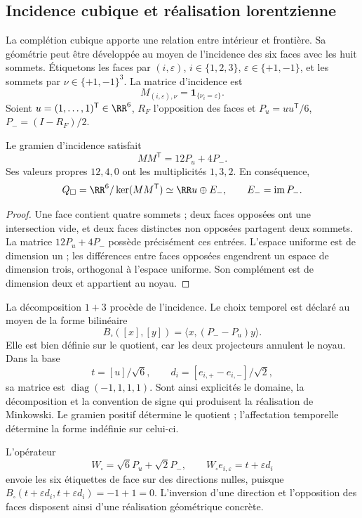 \subsection{Incidence cubique et réalisation lorentzienne}

La complétion cubique apporte une relation entre intérieur et frontière.
Sa géométrie peut être développée au moyen de l'incidence des six faces
avec les huit sommets. Étiquetons les faces par \((i,\varepsilon)\),
\(i\in\{1,2,3\}\), \(\varepsilon\in\{+1,-1\}\), et les sommets par
\(\nu\in\{+1,-1\}^3\). La matrice d'incidence est
\[
 M_{(i,\varepsilon),\nu}=\mathbf1_{\{\nu_i=\varepsilon\}}.
\]
Soient \(u=(1,\ldots,1)^{\mathsf T}\in\RR^6\), \(R_F\) l'opposition des faces et \(P_u=uu^{\mathsf T}/6\), \(P_-=(I-R_F)/2\).

\begin{proposition}
Le gramien d'incidence satisfait
\[
 MM^{\mathsf T}=12P_u+4P_-.
\]
Ses valeurs propres \(12,4,0\) ont les multiplicités \(1,3,2\).
En conséquence,
\[
 Q_\square=\RR^6/\ker(MM^{\mathsf T})
 \simeq\RR u\oplus E_-,\qquad E_-=\operatorname{im}P_-.
\]
\end{proposition}
\begin{proof}
Une face contient quatre sommets ; deux faces opposées ont une intersection vide, et deux faces distinctes non opposées partagent deux sommets. La matrice \(12P_u+4P_-\) possède précisément ces entrées. L'espace uniforme est de dimension un ; les différences entre faces opposées engendrent un espace de dimension trois, orthogonal à l'espace uniforme. Son complément est de dimension deux et appartient au noyau.
\end{proof}

La décomposition \(1+3\) procède de l'incidence. Le choix temporel
est déclaré au moyen de la forme bilinéaire
\[
 B_\square([x],[y])=\langle x,(P_--P_u)y\rangle.
\]
Elle est bien définie sur le quotient, car les deux projecteurs annulent le
noyau. Dans la base
\[
 t=[u]/\sqrt6,\qquad
 d_i=[e_{i,+}-e_{i,-}]/\sqrt2,
\]
sa matrice est \(\operatorname{diag}(-1,1,1,1)\). Sont ainsi explicités
le domaine, la décomposition et la convention de signe qui produisent
la réalisation de Minkowski. Le gramien positif détermine le quotient ;
l'affectation temporelle détermine la forme indéfinie sur celui-ci.

L'opérateur
\[
 W_\square=\sqrt6P_u+\sqrt2P_-,\qquad
 W_\square e_{i,\varepsilon}=t+\varepsilon d_i
\]
envoie les six étiquettes de face sur des directions nulles, puisque
\(B_\square(t+\varepsilon d_i,t+\varepsilon d_i)=-1+1=0\).
L'inversion d'une direction et l'opposition des faces disposent ainsi
d'une réalisation géométrique concrète.

